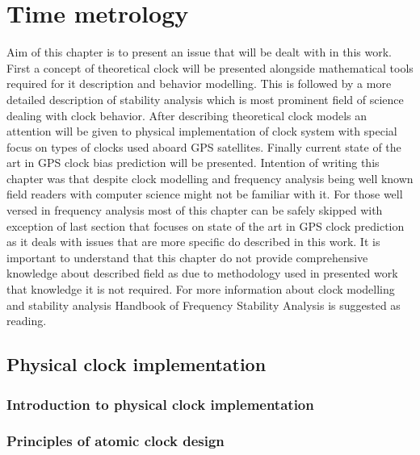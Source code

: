 \chapter{Time metrology}
Aim of this chapter is to present an issue that will be dealt with in this work.
First a concept of theoretical clock will be presented alongside mathematical tools required
for it description and behavior modelling.
This is followed by a more detailed description of stability analysis which is most prominent
field of science dealing with clock behavior.
After describing theoretical clock models an attention will be given to physical implementation
of clock system with special focus on types of clocks used aboard GPS satellites.
Finally current state of the art in GPS clock bias prediction will be presented.
Intention of writing this chapter was that despite clock modelling and frequency analysis being
well known field readers with computer science might not be familiar with it.
For those well versed in frequency analysis most of this chapter can be safely skipped with 
exception of last section that focuses on state of the art in GPS clock prediction as it 
deals with issues that are more specific do described in this work.
It is important to understand that this chapter do not provide comprehensive knowledge about
described field as due to methodology used in presented work that knowledge it is not required.
For more information about clock modelling and stability analysis Handbook of Frequency Stability
Analysis is suggested as reading.


\section{Physical clock implementation}
\label{sec:physical_clock}

\subsection{Introduction to physical clock implementation}

\subsection{Principles of atomic clock design}


